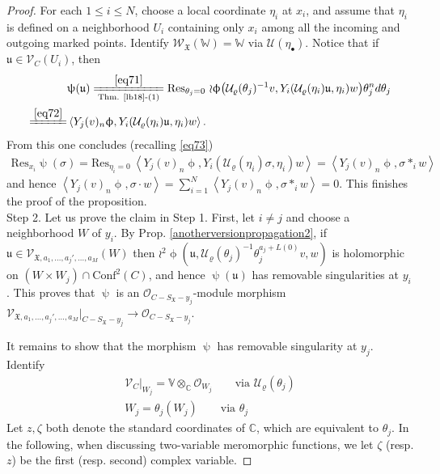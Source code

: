 \documentclass[11pt,b5paper,notitlepage]{article}
\theoremstyle{definition}
\theoremstyle{plain}
\newcommand{\fk}{\mathfrak}
\newcommand{\mc}{\mathcal}
\newcommand{\Conf}{\mathrm{Conf}}
\newcommand{\Res}{\mathrm{Res}}
\newcommand{\SV}{\mathscr{V}}
\newcommand{\scr}{\mathscr}
\newcommand{\SX}{{S_{\fk X}}}
\newcommand{\blt}{\bullet}
\newcommand{\Vbb}{\mathbb V}
\newcommand{\Wbb}{\mathbb W}
\newcommand{\Cbb}{\mathbb C}
\newcommand{\<}{\left\langle}
\renewcommand{\>}{\right\rangle}
\numberwithin{equation}{section}
\begin{document}
\begin{proof}
For each $1\leq i\leq N$, choose a local coordinate $\eta_i$ at $x_i$, and assume that $\eta_i$ is defined on a neighborhood $U_i$ containing only $x_i$ among all the incoming and outgoing marked points. Identify $\scr W_{\fk X}(\Wbb)=\Wbb$ via $\mc U(\eta_\blt)$. Notice that if $\fk u\in\SV_{C}(U_i)$, then
\begin{align}
&\uppsi(\fk u)\xlongequal[\text{Thm. \ref{lb18}-(1)}]{\eqref{eq71}}\Res_{\theta_j=0}~{\wr \upphi}\big(\mc U_\varrho(\theta_j)^{-1}v,Y_i(\mc U_\varrho(\eta_i)\fk u,\eta_i)w\big)\theta_j^n d\theta_j\nonumber\\
\xlongequal{\eqref{eq72}}&\<Y_j(v)_n \upphi,Y_i(\mc U_\varrho(\eta_i)\fk u,\eta_i)w\>.\label{eq70}
\end{align}
From this one concludes (recalling \eqref{eq73})
\begin{align*}
\Res_{x_i}\uppsi(\sigma)=\Res_{\eta_i=0}~\<Y_j(v)_n \upphi,Y_i(\mc U_\varrho(\eta_i)\sigma,\eta_i)w\>=\<Y_j(v)_n \upphi,\sigma*_iw\>
\end{align*}
and hence $\<Y_j(v)_n \upphi,\sigma\cdot w\>=\sum_{i=1}^N \<Y_j(v)_n \upphi,\sigma*_iw\>=0$. This finishes the proof of the proposition.\\








Step 2. Let us prove the claim in Step 1. First, let $i\neq j$ and choose a neighborhood  $W$ of $y_i$. By Prop. \ref{anotherversionpropagation2}, if $\fk u\in\scr V_{\fk X,a_1,\dots,a_j',\dots,a_M}(W)$ then $\wr^2\upphi(\fk u,\mc U_\varrho(\theta_j)^{-1}\theta_j^{a_j+L(0)}v,w)$ is holomorphic on $(W\times W_j)\cap\Conf^2(C)$, and hence $\uppsi(\fk u)$ has removable singularities at $y_i$.
This proves that $\uppsi$ is an $\mc O_{C-\SX-y_j}$-module morphism $\scr V_{\fk X,a_1,\dots,a_j',\dots,a_M}|_{C-\SX-y_j}\rightarrow\mc O_{C-\SX-y_j}$.




It remains to show that the morphism $\uppsi$ has removable singularity at $y_j$. Identify
\begin{subequations}\label{eq77}
\begin{gather}
\scr V_C|_{W_j}=\Vbb\otimes_\Cbb\mc O_{W_j} \qquad\text{via }\mc U_\varrho(\theta_j)\\
W_j=\theta_j(W_j)\qquad\text{via }\theta_j
\end{gather}
\end{subequations}
Let $z,\zeta$ both denote the standard coordinates of $\Cbb$, which are equivalent to $\theta_j$. In the following, when discussing two-variable meromorphic functions, we let $\zeta$ (resp. $z$) be the first (resp. second) complex variable.
        



\end{proof}
\end{document}
